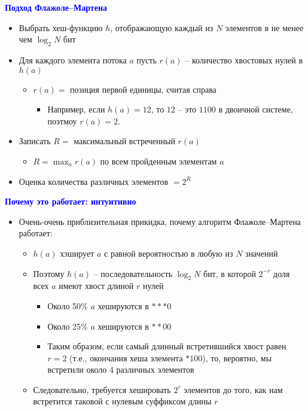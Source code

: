 \documentclass[landscape]{slides}
\begin{document}
\begin{normalsize}
\begin{slide}
\textbf{\textcolor{blue}{Подход Флажоле--Мартена}}

\begin{itemize}
\item Выбрать хеш-функцию $h$, отображающую каждый из $N$ элементов в не менее чем $\log_2 N$ бит
\item Для каждого элемента потока $a$ пусть $r(a)$ -- количество хвостовых нулей в $h(a)$
  \begin{itemize}
  \item $r(a) = $ позиция первой единицы, считая справа
    \begin{itemize}
    \item Например, если $h(a)=12$, то $12$ -- это $1100$ в двоичной системе, поэтмоу $r(a)=2$.
    \end{itemize}
  \end{itemize}
\item Записать $R=$ максимальный встреченный $r(a)$
  \begin{itemize}
  \item $R = \max_a r(a)$ по всем пройденным элементам $a$
  \end{itemize}
\item Оценка количества различных элементов $=2^R$
\end{itemize}

\end{slide}


\begin{slide}
\textbf{\textcolor{blue}{Почему это работает: интуитивно}}

\begin{itemize}
\item Очень-очень приблизительная прикидка, почему алгоритм Флажоле--Мартена работает:
  \begin{itemize}
  \item $h(a)$ хэширует $a$ с равной вероятностью в любую из $N$ значений
  \item Поэтому $h(a)$ -- последовательность $\log_2 N$ бит, в которой
$2^{-r}$ доля всех $a$ имеют хвост длиной $r$ нулей
    \begin{itemize}
    \item Около 50\% $a$ хешируются в $***0$
    \item Около 25\% $a$ хешируются в $**00$
    \item Таким образом, если самый длинный встретившийся хвост равен $r=2$ (т.е., окончания хеша элемента $*100$), то, вероятно, мы встретили около 4 различных элементов
    \end{itemize}
  \item Следовательно, требуется хешировать $2^r$ элементов до того, как нам встретится таковой с нулевым суффиксом длины $r$
  \end{itemize}
\end{itemize}
\end{slide}



\end{normalsize}
\end{document}
